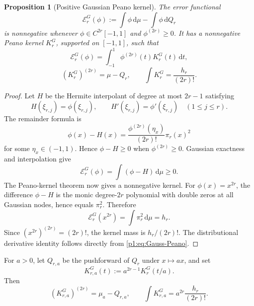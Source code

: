 \documentclass[11pt]{article}
\numberwithin{equation}{section}
\newtheorem{proposition}[theorem]{Proposition}
\theoremstyle{definition}
\theoremstyle{remark}
\newcommand{\dd}{\,\mathrm d}
\begin{document}
\begin{proposition}[Positive Gaussian Peano kernel]
\label{p1:prop:gauss-kernel}
The error functional
\begin{equation}
 \mathcal E_r^G(\phi):=\int\phi\dd\mu-\int\phi\dd Q_r
 \label{p1:eq:Gauss-functional}
\end{equation}
is nonnegative whenever $\phi\in C^{2r}[-1,1]$ and $\phi^{(2r)}\ge0$.  It has a nonnegative Peano kernel $K_r^G$, supported on $[-1,1]$, such that
\begin{equation}
 \mathcal E_r^G(\phi)=\int_{-1}^{1}\phi^{(2r)}(t)K_r^G(t)\dd t,
 \label{p1:eq:Gauss-Peano}
\end{equation}
\begin{equation}
 (K_r^G)^{(2r)}=\mu-Q_r,
 \qquad
 \int K_r^G=\frac{h_r}{(2r)!}.
 \label{p1:eq:Gauss-kernel-mass}
\end{equation}
\end{proposition}

\begin{proof}
Let $H$ be the Hermite interpolant of degree at most $2r-1$ satisfying
\[
 H(\xi_{r,j})=\phi(\xi_{r,j}),
 \qquad
 H'(\xi_{r,j})=\phi'(\xi_{r,j})
 \quad(1\le j\le r).
\]
The remainder formula is
\begin{equation}
 \phi(x)-H(x)=\frac{\phi^{(2r)}(\eta_x)}{(2r)!}\pi_r(x)^2
 \label{p1:eq:Hermite-Gauss-remainder}
\end{equation}
for some $\eta_x\in(-1,1)$.  Hence $\phi-H\ge0$ when $\phi^{(2r)}\ge0$.  Gaussian exactness and interpolation give
\[
 \mathcal E_r^G(\phi)
 =\int(\phi-H)\dd\mu\ge0.
\]
The Peano-kernel theorem now gives a nonnegative kernel.  For $\phi(x)=x^{2r}$, the difference $\phi-H$ is the monic degree-$2r$ polynomial with double zeros at all Gaussian nodes, hence equals $\pi_r^2$.  Therefore
\[
 \mathcal E_r^G(x^{2r})=\int\pi_r^2\dd\mu=h_r.
\]
Since $(x^{2r})^{(2r)}=(2r)!$, the kernel mass is $h_r/(2r)!$.  The distributional derivative identity follows directly from \eqref{p1:eq:Gauss-Peano}.
\end{proof}

For $a>0$, let $Q_{r,a}$ be the pushforward of $Q_r$ under $x\mapsto ax$, and set
\begin{equation}
 K_{r,a}^G(t):=a^{2r-1}K_r^G(t/a).
 \label{p1:eq:scaled-G-kernel}
\end{equation}
Then
\begin{equation}
 (K_{r,a}^G)^{(2r)}=\mu_a-Q_{r,a},
 \qquad
 \int K_{r,a}^G=a^{2r}\frac{h_r}{(2r)!}.
 \label{p1:eq:scaled-G-properties}
\end{equation}
\end{document}
